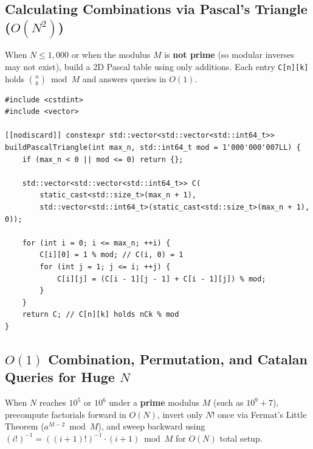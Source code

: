 \documentclass[11pt,a4paper]{article}
\theoremstyle{definition}
\begin{document}
\subsection{Calculating Combinations via Pascal's Triangle ($O(N^2)$)}

When $N \le 1{,}000$ or when the modulus $M$ is \textbf{not prime} (so modular inverses may not exist), build a 2D Pascal table using only additions. Each entry \texttt{C[n][k]} holds $\binom{n}{k} \bmod M$ and answers queries in $O(1)$.

\begin{lstlisting}[caption={Division-Free Pascal's Triangle Table ($O(N^2)$ Build, Any Modulus)}]
#include <cstdint>
#include <vector>

[[nodiscard]] constexpr std::vector<std::vector<std::int64_t>>
buildPascalTriangle(int max_n, std::int64_t mod = 1'000'000'007LL) {
    if (max_n < 0 || mod <= 0) return {};

    std::vector<std::vector<std::int64_t>> C(
        static_cast<std::size_t>(max_n + 1),
        std::vector<std::int64_t>(static_cast<std::size_t>(max_n + 1), 0));

    for (int i = 0; i <= max_n; ++i) {
        C[i][0] = 1 % mod; // C(i, 0) = 1
        for (int j = 1; j <= i; ++j) {
            C[i][j] = (C[i - 1][j - 1] + C[i - 1][j]) % mod;
        }
    }
    return C; // C[n][k] holds nCk % mod
}
\end{lstlisting}

\subsection{$O(1)$ Combination, Permutation, and Catalan Queries for Huge $N$}

When $N$ reaches $10^5$ or $10^6$ under a \textbf{prime} modulus $M$ (such as $10^9 + 7$), precompute factorials forward in $O(N)$, invert only $N!$ once via Fermat's Little Theorem ($a^{M-2} \bmod M$), and sweep backward using $(i!)^{-1} = ((i + 1)!)^{-1} \cdot (i + 1) \bmod M$ for $O(N)$ total setup.
\end{document}
